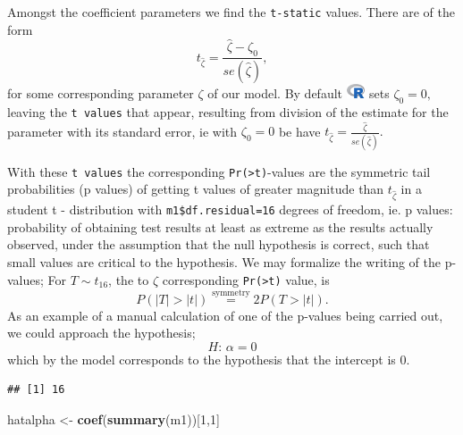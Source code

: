 \documentclass[
]{article}
\newenvironment{Shaded}{\begin{snugshade}}{\end{snugshade}}
\newcommand{\DecValTok}[1]{\textcolor[rgb]{0.00,0.00,0.81}{#1}}
\newcommand{\KeywordTok}[1]{\textcolor[rgb]{0.13,0.29,0.53}{\textbf{#1}}}
\newcommand{\NormalTok}[1]{#1}
\newcommand{\OperatorTok}[1]{\textcolor[rgb]{0.81,0.36,0.00}{\textbf{#1}}}
\newcommand{\StringTok}[1]{\textcolor[rgb]{0.31,0.60,0.02}{#1}}
\begin{document}
Amongst the coefficient parameters we find the \texttt{t-static} values.
There are of the form \[
t_{\hat\zeta}=\frac{\hat\zeta-\zeta_0}{se(\hat\zeta)},
\] for some corresponding parameter \(\zeta\) of our model. By default
\includegraphics[width=\textwidth,height=0.16667in]{R_logo.png} sets
\(\zeta_0=0,\) leaving the \texttt{t\ values} that appear, resulting
from division of the estimate for the parameter with its standard error,
ie with \(\zeta_0=0\) be have
\(t_{\hat\zeta}=\frac{\hat\zeta}{se(\hat\zeta)}.\)

With these \texttt{t\ values} the corresponding
\texttt{Pr(\textgreater{}\textbar{}t\textbar{})}-values are the
symmetric tail probabilities (p values) of getting t values of greater
magnitude than \(t_{\hat\zeta}\) in a student t - distribution with
\texttt{m1\$df.residual=16} degrees of freedom, ie. p values:
probability of obtaining test results at least as extreme as the results
actually observed, under the assumption that the null hypothesis is
correct, such that small values are critical to the hypothesis. We may
formalize the writing of the p-values; For \(T\sim t_{16}\), the to
\(\zeta\) corresponding \texttt{Pr(\textgreater{}\textbar{}t\textbar{})}
value, is \[
P(|T|>|t|)\overset{\text{symmetry}}{=}2P(T>|t|).
\] As an example of a manual calculation of one of the p-values being
carried out, we could approach the hypothesis; \[
H:\,\alpha = 0
\] which by the model corresponds to the hypothesis that the intercept
is \(0.\)

\begin{Shaded}
\end{Shaded}

\begin{verbatim}
## [1] 16
\end{verbatim}

\begin{Shaded}
\begin{Highlighting}[]
\NormalTok{hatalpha <-}\StringTok{ }\KeywordTok{coef}\NormalTok{(}\KeywordTok{summary}\NormalTok{(m1))[}\DecValTok{1}\NormalTok{,}\DecValTok{1}\NormalTok{]}
\end{Highlighting}
\end{Shaded}
\end{document}
